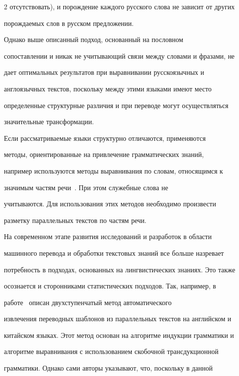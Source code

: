 \begin{multicols}{2}
отсутствовать), и по\-рож\-де\-ние каждого русского слова не зависит от других 


порождаемых слов в русском предложении.





Однако выше описанный подход, основанный на пословном


сопоставлении и никак не учитывающий связи между словами и фразами, не


дает оптимальных результатов при выравнивании русскоязычных и


англоязычных текстов, поскольку между этими языками имеют место


определенные структурные различия и при переводе могут осуществляться


значительные трансформации.





Если рассматриваемые языки структурно отличаются, применяются


методы, ориентированные на привлечение грамматических знаний,


например используются методы выравнивания по словам, относящимся к


значимым частям речи~\cite{40koz}. При этом служебные слова не


учитываются. Для использования этих методов необходимо про\-из\-вес\-ти


разметку параллельных текстов по частям речи.





На современном этапе развития исследований и разработок в области


машинного перевода и обработки текстовых знаний все больше назревает


потребность в подходах, основанных на лингвистических знаниях. Это также


осознается и сторонниками статистических подходов. Так, например, в


работе~\cite{41koz} описан двухступенчатый метод автоматического


извлечения переводных шаблонов из параллельных текстов на английском и


китайском языках. Этот метод основан на алгоритме индукции грамматики и


алгоритме выравнивания с использованием скобочной трансдукционной


грамматики. Однако сами авторы указывают, что, поскольку в данной



\end{multicols}
